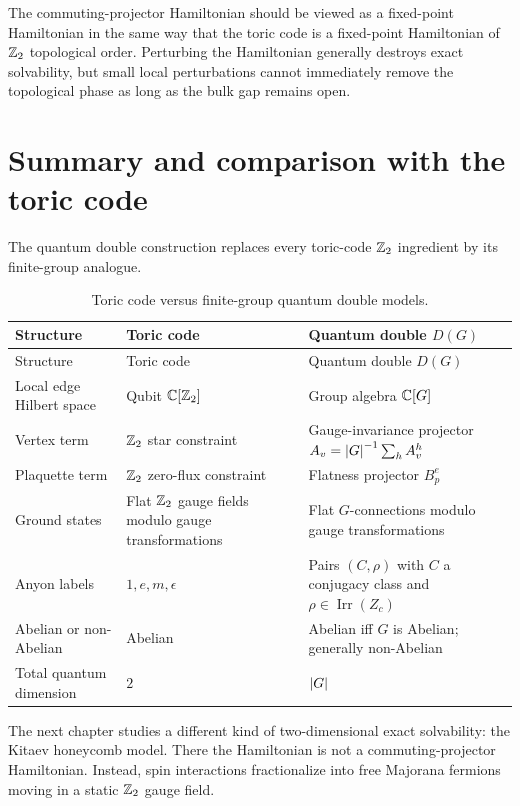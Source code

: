 The commuting-projector Hamiltonian should be viewed as a fixed-point
Hamiltonian in the same way that the toric code is a fixed-point Hamiltonian of
\(\mathbb{Z}_2\) topological order.  Perturbing the Hamiltonian generally destroys
exact solvability, but small local perturbations cannot immediately remove the
topological phase as long as the bulk gap remains open.

\section{Summary and comparison with the toric code}
\label{sec:quantum-double-summary}

The quantum double construction replaces every toric-code \(\mathbb{Z}_2\) ingredient
by its finite-group analogue.

{\small
\begin{longtable}{L{0.27\textwidth}L{0.30\textwidth}L{0.32\textwidth}}
\caption{Toric code versus finite-group quantum double models.}
\label{tab:toric-code-vs-quantum-double}\\
\toprule
Structure & Toric code & Quantum double \(D(G)\) \\
\midrule
\endfirsthead
\toprule
Structure & Toric code & Quantum double \(D(G)\) \\
\midrule
\endhead
Local edge Hilbert space & Qubit \(\mathbb{C}[\mathbb{Z}_2]\) & Group algebra \(\mathbb{C}[G]\) \\
Vertex term & \(\mathbb{Z}_2\) star constraint & Gauge-invariance projector \(A_v=\left|G\right|^{-1}\sum_h A_v^h\) \\
Plaquette term & \(\mathbb{Z}_2\) zero-flux constraint & Flatness projector \(B_p^e\) \\
Ground states & Flat \(\mathbb{Z}_2\) gauge fields modulo gauge transformations & Flat \(G\)-connections modulo gauge transformations \\
Anyon labels & \(1,e,m,\epsilon\) & Pairs \((C,\rho)\) with \(C\) a conjugacy class and \(\rho\in\operatorname{Irr}(Z_c)\) \\
Abelian or non-Abelian & Abelian & Abelian iff \(G\) is Abelian; generally non-Abelian \\
Total quantum dimension & \(2\) & \(\left|G\right|\) \\
\bottomrule
\end{longtable}}


The next chapter studies a different kind of two-dimensional exact solvability:
the Kitaev honeycomb model.  There the Hamiltonian is not a commuting-projector
Hamiltonian.  Instead, spin interactions fractionalize into free Majorana
fermions moving in a static \(\mathbb{Z}_2\) gauge field.
